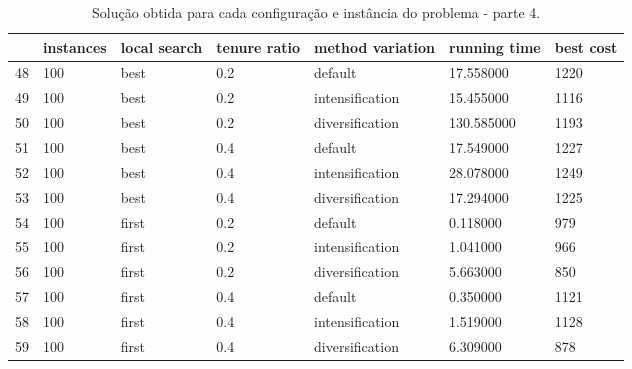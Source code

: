 \begin{landscape}
\begin{table}
\centering
\begin{tabular}{lllllll}
\toprule
{} & instances & local search & tenure ratio & method variation & running time & best cost \\
\midrule
48 &       100 &         best &          0.2 &          default &    17.558000 &      1220 \\
49 &       100 &         best &          0.2 &  intensification &    15.455000 &      1116 \\
50 &       100 &         best &          0.2 &  diversification &   130.585000 &      1193 \\
51 &       100 &         best &          0.4 &          default &    17.549000 &      1227 \\
52 &       100 &         best &          0.4 &  intensification &    28.078000 &      1249 \\
53 &       100 &         best &          0.4 &  diversification &    17.294000 &      1225 \\
54 &       100 &        first &          0.2 &          default &     0.118000 &       979 \\
55 &       100 &        first &          0.2 &  intensification &     1.041000 &       966 \\
56 &       100 &        first &          0.2 &  diversification &     5.663000 &       850 \\
57 &       100 &        first &          0.4 &          default &     0.350000 &      1121 \\
58 &       100 &        first &          0.4 &  intensification &     1.519000 &      1128 \\
59 &       100 &        first &          0.4 &  diversification &     6.309000 &       878 \\
\bottomrule
\end{tabular}
\caption{Solução obtida para cada configuração e instância do problema - parte 4.}
\label{table:all-data-4}
\end{table}

\end{landscape}
